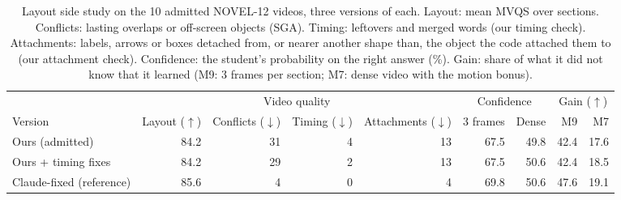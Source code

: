 \begin{table}[!tbp]\centering\small
\caption{Layout side study on the 10 admitted NOVEL-12 videos, three versions of each. Layout: mean MVQS over sections. Conflicts: lasting overlaps or off-screen objects (SGA). Timing: leftovers and merged words (our timing check). Attachments: labels, arrows or boxes detached from, or nearer another shape than, the object the code attached them to (our attachment check). Confidence: the student's probability on the right answer (\%). Gain: share of what it did not know that it learned (M9: 3 frames per section; M7: dense video with the motion bonus).}\label{tab:layout_study}
\begin{adjustbox}{max width=\linewidth}\begin{tabular}{lrrrrrrrr}\toprule & \multicolumn{4}{c}{Video quality} & \multicolumn{2}{c}{Confidence} & \multicolumn{2}{c}{Gain ($\uparrow$)}\\
\cmidrule(lr){2-5}\cmidrule(lr){6-7}\cmidrule(lr){8-9}
Version & Layout ($\uparrow$) & Conflicts ($\downarrow$) & Timing ($\downarrow$) & Attachments ($\downarrow$) & 3 frames & Dense & M9 & M7\\\midrule
Ours (admitted) & 84.2 & 31 & 4 & 13 & 67.5 & 49.8 & 42.4 & 17.6 \\
Ours + timing fixes & 84.2 & 29 & 2 & 13 & 67.5 & 50.6 & 42.4 & 18.5 \\
Claude-fixed (reference) & 85.6 & 4 & 0 & 4 & 69.8 & 50.6 & 47.6 & 19.1 \\
\bottomrule\end{tabular}\end{adjustbox}
\end{table}
